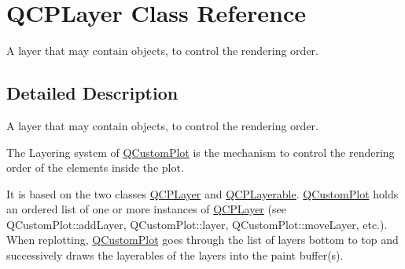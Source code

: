 \hypertarget{class_q_c_p_layer}{}\section{Q\+C\+P\+Layer Class Reference}
\label{class_q_c_p_layer}


A layer that may contain objects, to control the rendering order.  




\subsection{Detailed Description}
A layer that may contain objects, to control the rendering order. 

The Layering system of \mbox{\hyperlink{class_q_custom_plot}{Q\+Custom\+Plot}} is the mechanism to control the rendering order of the elements inside the plot.

It is based on the two classes \mbox{\hyperlink{class_q_c_p_layer}{Q\+C\+P\+Layer}} and \mbox{\hyperlink{class_q_c_p_layerable}{Q\+C\+P\+Layerable}}. \mbox{\hyperlink{class_q_custom_plot}{Q\+Custom\+Plot}} holds an ordered list of one or more instances of \mbox{\hyperlink{class_q_c_p_layer}{Q\+C\+P\+Layer}} (see Q\+Custom\+Plot\+::add\+Layer, Q\+Custom\+Plot\+::layer, Q\+Custom\+Plot\+::move\+Layer, etc.). When replotting, \mbox{\hyperlink{class_q_custom_plot}{Q\+Custom\+Plot}} goes through the list of layers bottom to top and successively draws the layerables of the layers into the paint buffer(s).

